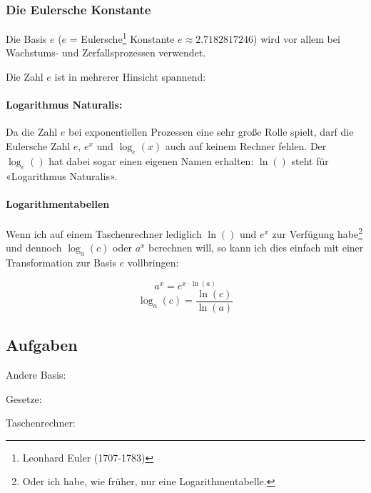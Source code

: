 \subsubsection{Die Eulersche Konstante}

Die Basis $e$ ($e$ = Eulersche\footnote{Leonhard Euler (1707-1783)} Konstante $e\approx 2.7182817246$) wird vor allem bei Wachstums- und Zerfallsprozessen verwendet.

Die Zahl $e$ ist in mehrerer Hinsicht spannend:

\paragraph{Logarithmus Naturalis:} Da die
Zahl $e$ bei exponentiellen Prozessen eine sehr große Rolle spielt,
darf die Eulersche Zahl $e$, $e^x$ und $\log_e(x)$ auch auf keinem Rechner fehlen. Der $\log_e()$ hat dabei sogar einen eigenen Namen erhalten:
$\ln()$ steht für «Logarithmus Naturalis».

\begin{center}
\end{center}

\paragraph{Logarithmentabellen}
Wenn ich auf einem Taschenrechner lediglich $\ln()$ und $e^x$ zur Verfügung habe\footnote{Oder ich habe, wie früher, nur eine Logarithmentabelle.} und dennoch $\log_a(c)$ oder $a^x$ berechnen will, so kann ich dies einfach mit einer Transformation zur Basis $e$ vollbringen:

$$a^x = e^{x\cdot{}\ln(a)}$$
$$\log_a(c) = \frac{\ln(c)}{\ln(a)}$$

\newpage




\subsection*{Aufgaben}

Andere Basis:


Gesetze:


Taschenrechner:


